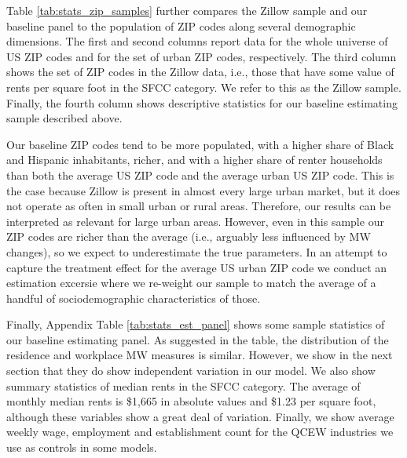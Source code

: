 Table \ref{tab:stats_zip_samples} further compares the Zillow sample and our
baseline panel to the population of ZIP codes along several demographic 
dimensions. 
The first and second columns report data for the whole universe of US ZIP codes 
and for the set of urban ZIP codes, respectively.
The third column shows the set of ZIP codes in the Zillow data, i.e., those 
that have some value of rents per square foot in the SFCC category.
We refer to this as the Zillow sample.
Finally, the fourth column shows descriptive statistics for our baseline 
estimating sample described above.

Our baseline ZIP codes tend to be more populated, with a higher share of Black 
and Hispanic inhabitants, richer, and with a higher share of renter households 
than both the average US ZIP code and the average urban US ZIP code.
This is the case because Zillow is present in almost every large urban market, 
but it does not operate as often in small urban or rural areas.
Therefore, our results can be interpreted as relevant for large urban areas.
However, even in this sample our ZIP codes are richer than the average 
(i.e., arguably less influenced by MW changes), so we expect to underestimate 
the true parameters.
In an attempt to capture the treatment effect for the average US urban ZIP code 
we conduct an estimation excersie where we re-weight our sample to match the 
average of a handful of sociodemographic characteristics of those.

Finally, Appendix Table \ref{tab:stats_est_panel} shows some sample statistics 
of our baseline estimating panel.
As suggested in the table, the distribution of the residence and workplace MW 
measures is similar.
However, we show in the next section that they do show independent variation
in our model.
We also show summary statistics of median rents in the SFCC category.
The average of monthly median rents is \$1,665 in absolute values and \$1.23 
per square foot, although these variables show a great deal of variation.
Finally, we show average weekly wage, employment and establishment count 
for the QCEW industries we use as controls in some models.
